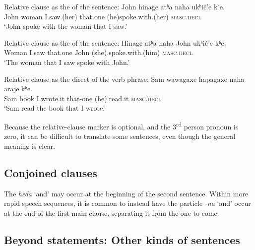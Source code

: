\documentclass[output=paper]{LSP/langsci}
\begin{document}
\begin{exe}
\ex
\begin{xlist}
\ex {}Relative clause as the  of the sentence:
\gll John hinage  atʰa            naha           ukʰi\v{c}'e      kʰe.	 \\				
John woman I.saw.(her) that.one (he)spoke.with.(her) \textsc{masc.decl}	 \\
\trans `John spoke with the woman that I saw.'

\ex {}Relative clause as the  of the sentence:
\gll Hinage    atʰa    naha     John          ukʰi\v{c}'e     kʰe. \\
	Woman   I.saw that.one  John (she).spoke.with.(him) \textsc{masc.decl} \\
\trans `The woman that I saw spoke with John.'

\ex {}Relative clause as the direct  of the verb phrase:
\gll Sam wawagaxe hapagaxe    naha           araje       kʰe.	\\				
Sam  book         I.wrote.it   that-one   (he).read.it   \textsc{masc.decl}	\\	
\trans `Sam read the book that I wrote.'
\end{xlist}
\end{exe}

Because the relative-clause marker is optional, and the 3\textsuperscript{rd} person pronoun is zero, it can be difficult to translate some sentences, even though the general meaning is clear.      	

\subsection{Conjoined clauses}	
The  \textit{heda} `and' may occur at the beginning of the second sentence.  Within more rapid speech sequences, it is common to instead have the particle \textit{-na} `and' occur at the end of the first main clause, separating it from the one to come.	

\subsection{Beyond statements: Other kinds of sentences} 
\end{document}

